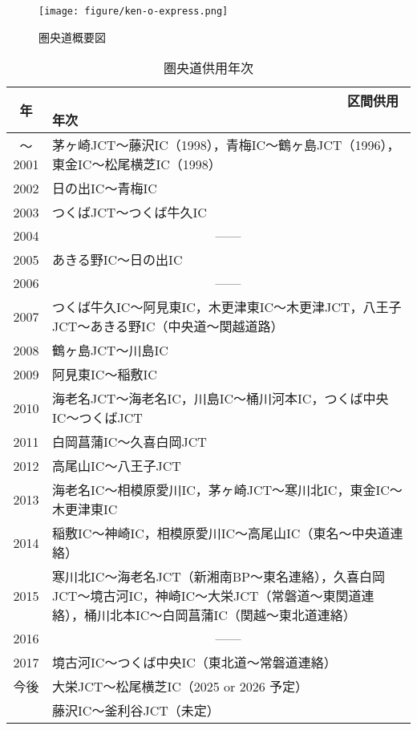 \begin{figure}[h]
  \centering
  \texttt{[image: figure/ken-o-express.png]}
  \caption{圏央道概要図}
  \label{fig:ken-o-express}
\end{figure}
\newpage
\begin{table}[H]
  \begin{center}
    \caption{圏央道供用年次}
    \vspace{1.5zw}
    \begin{tabular}{|c|p{12cm}|}\hline \label{圏央道供用年次}
      年 & ~~~~~~~~~~~~~~~~~~~~~~~~~~~~~~~~~~~~~~~~区間供用年次 \\ \hline \hline
      〜2001 & 茅ヶ崎JCT〜藤沢IC（1998），青梅IC〜鶴ヶ島JCT（1996），東金IC〜松尾横芝IC（1998） \\ \hline
      2002 & 日の出IC〜青梅IC \\ \hline
      2003 & つくばJCT〜つくば牛久IC \\ \hline
      2004 & \multicolumn{1}{|c|}{------} \\ \hline
      2005 & あきる野IC〜日の出IC \\ \hline
      2006 & \multicolumn{1}{|c|}{------} \\ \hline
      2007 & つくば牛久IC〜阿見東IC，木更津東IC〜木更津JCT，八王子JCT〜あきる野IC（中央道〜関越道路） \\ \hline
      2008 & 鶴ヶ島JCT〜川島IC \\ \hline
      2009 & 阿見東IC〜稲敷IC \\ \hline
      2010 & 海老名JCT〜海老名IC，川島IC〜桶川河本IC，つくば中央IC〜つくばJCT \\ \hline
      2011 & 白岡菖蒲IC〜久喜白岡JCT \\ \hline
      2012 & 高尾山IC〜八王子JCT \\ \hline
      2013 & 海老名IC〜相模原愛川IC，茅ヶ崎JCT〜寒川北IC，東金IC〜木更津東IC \\ \hline
      2014 & 稲敷IC〜神崎IC，相模原愛川IC〜高尾山IC（東名〜中央道連絡） \\ \hline
      2015 & 寒川北IC〜海老名JCT（新湘南BP〜東名連絡），久喜白岡JCT〜境古河IC，神崎IC〜大栄JCT（常磐道〜東関道連絡），桶川北本IC〜白岡菖蒲IC（関越〜東北道連絡） \\ \hline
      2016 & \multicolumn{1}{|c|}{------} \\ \hline
      2017 & 境古河IC〜つくば中央IC（東北道〜常磐道連絡） \\ \hline
      今後 & 大栄JCT〜松尾横芝IC（2025 or 2026 予定）\\ \hline
      & 藤沢IC〜釜利谷JCT（未定） \\ \hline
    \end{tabular}
  \end{center}
\end{table}
